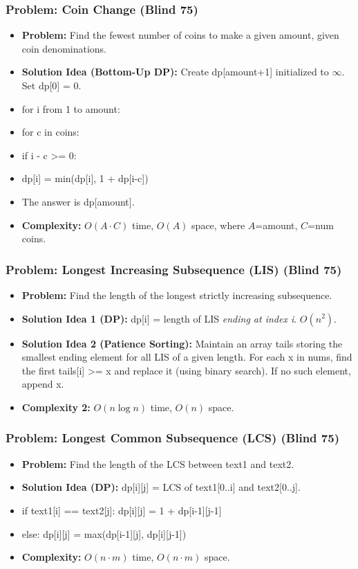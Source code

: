 \subsubsection{Problem: Coin Change (Blind 75)}
\begin{itemize}
\item \textbf{Problem:} Find the fewest number of coins to make a given amount, given coin denominations.
\item \textbf{Solution Idea (Bottom-Up DP):} Create dp[amount+1] initialized to $\infty$. Set dp[0] = 0.
\item for i from 1 to amount:
\item for c in coins:
\item if i - c >= 0:
\item dp[i] = min(dp[i], 1 + dp[i-c])
\item The answer is dp[amount].
\item \textbf{Complexity:} $O(A \cdot C)$ time, $O(A)$ space, where $A$=amount, $C$=num coins.
\end{itemize}

\subsubsection{Problem: Longest Increasing Subsequence (LIS) (Blind 75)}
\begin{itemize}
\item \textbf{Problem:} Find the length of the longest strictly increasing subsequence.
\item \textbf{Solution Idea 1 (DP):} dp[i] = length of LIS \textit{ending at index i}. $O(n^2)$.
\item \textbf{Solution Idea 2 (Patience Sorting):} Maintain an array tails storing the smallest ending element for all LIS of a given length. For each x in nums, find the first tails[i] >= x and replace it (using binary search). If no such element, append x.
\item \textbf{Complexity 2:} $O(n \log n)$ time, $O(n)$ space.
\end{itemize}

\subsubsection{Problem: Longest Common Subsequence (LCS) (Blind 75)}
\begin{itemize}
\item \textbf{Problem:} Find the length of the LCS between text1 and text2.
\item \textbf{Solution Idea (DP):} dp[i][j] = LCS of text1[0..i] and text2[0..j].
\item if text1[i] == text2[j]: dp[i][j] = 1 + dp[i-1][j-1]
\item else: dp[i][j] = max(dp[i-1][j], dp[i][j-1])
\item \textbf{Complexity:} $O(n \cdot m)$ time, $O(n \cdot m)$ space.
\end{itemize}

